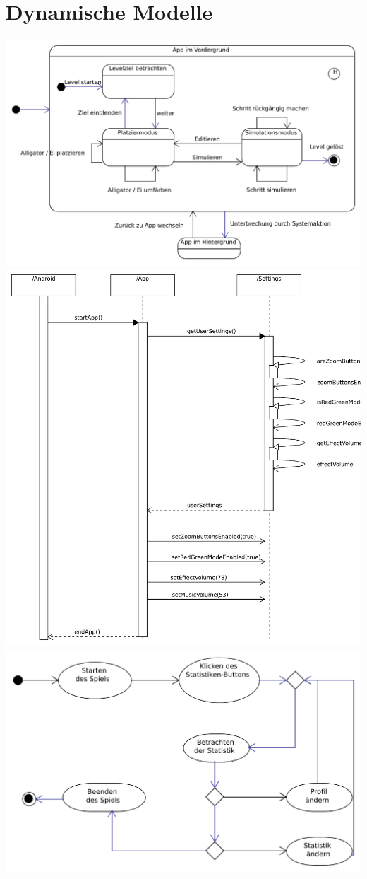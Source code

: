 \section{Dynamische Modelle}
\clearpage
\includegraphics[scale=0.6]{Systemmodelle/game_state.pdf}
\clearpage
\includegraphics[scale=0.6]{Systemmodelle/edit_settings_sequence.pdf}
\clearpage
\includegraphics[scale=0.6]{Systemmodelle/parent_activity.pdf}
